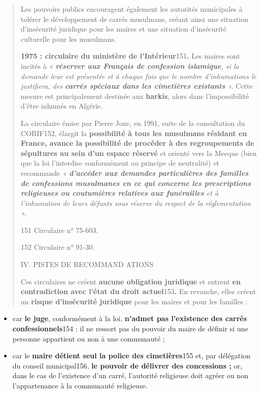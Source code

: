 \begin{quote}
Les pouvoirs publics encouragent également les autorités municipales à
tolérer le développement de carrés musulmans, créant ainsi une situation
d'insécurité juridique pour les maires et une situation d'insécurité
culturelle pour les musulmans.

\textbf{1975 : circulaire du ministère de l'Intérieur}151\textbf{.} Les
maires sont incités à \emph{« \textbf{réserver aux Français de
confession islamique}, si la demande leur est présentée et à chaque fois
que le nombre d'inhumations le justifiera, des \textbf{carrés spéciaux
dans les cimetières existants} ».} Cette mesure est principalement
destinée aux \textbf{harkis}, alors dans l'impossibilité d'être inhumés
en Algérie.

La circulaire émise par Pierre Joxe, en 1991, suite de la consultation
du CORIF152, élargit la \textbf{possibilité à tous les musulmans
résidant en France, avance la possibilité de procéder à des
regroupements de sépultures au sein d'un espace réservé} et orienté vers
la Mecque (bien que la loi l'interdise conformément au principe de
neutralité) et recommande \emph{« \textbf{d'accéder aux demandes
particulières des familles de confessions musulmanes en ce qui concerne
les prescriptions religieuses ou coutumières relatives aux funérailles}
et à l'inhumation de leurs défunts sous réserve du respect de la
réglementation ».}

151 Circulaire n° 75-603.

152 Circulaire n° 91-30.

IV. PISTES DE RECOMMAND ATIONS

Ces circulaires ne créent \textbf{aucune obligation juridique} et
entrent \textbf{en contradiction avec l'état du droit
actuel}153\textbf{.} En revanche, elles créent un \textbf{risque
d'insécurité juridique} pour les maires et pour les familles :
\end{quote}

\begin{itemize}
\item
  car \textbf{le juge}, conformément à la loi, \textbf{n'admet pas
  l'existence des carrés confessionnels}154 : il ne ressort pas du
  pouvoir du maire de définir si une personne appartient ou non à une
  communauté ;
\item
  car le \textbf{maire détient seul la police des cimetières}155 et, par
  délégation du conseil municipal156, \textbf{le pouvoir de délivrer des
  concessions ;} or, dans le cas de l'existence d'un carré, l'autorité
  religieuse doit agréer ou non l'appartenance à la communauté
  religieuse.
\end{itemize}

